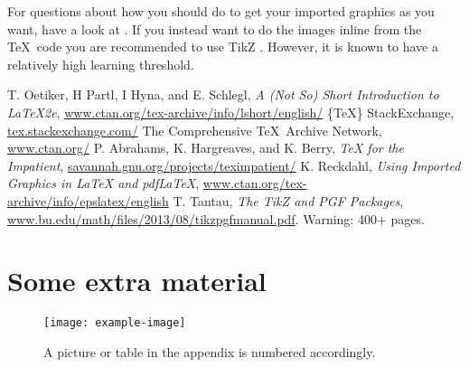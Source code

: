 \documentclass[11pt,twoside]{eitExjobb}
\begin{document}
For questions about how you should do to get your imported graphics as you want, have a look at \cite{cite:ImportedGraphics}. If you instead want to do the images inline from the \TeX\ code you are recommended to use TikZ \cite{cite:TikZ}. However, it is known to have a relatively high learning threshold. 

\begin{thebibliography}{99}
 T. Oetiker, H Partl, I Hyna, and E. Schlegl, \textit{A (Not So) Short Introduction to \LaTeX2e}, \url{www.ctan.org/tex-archive/info/lshort/english/}
 \{\TeX\} StackExchange, \url{tex.stackexchange.com/}
 The Comprehensive \TeX\ Archive Network, \url{www.ctan.org/}
 P. Abrahams, K. Hargreaves, and K. Berry, \textit{TeX for the Impatient}, \url{savannah.gnu.org/projects/teximpatient/}
 K. Reckdahl, \textit{Using Imported Graphics in LaTeX and pdfLaTeX}, \url{www.ctan.org/tex-archive/info/epslatex/english}
 T. Tantau, \textit{The TikZ and PGF Packages}, \url{www.bu.edu/math/files/2013/08/tikzpgfmanual.pdf}. Warning: 400+ pages.
\end{thebibliography}


\appendix
\chapter{Some extra material}
\lipsum[1]
\begin{figure}[htbp]
  \centering
  \texttt{[image: example-image]}
  \caption{A picture or table in the appendix is numbered accordingly.}
  \label{fig:AppFig}
\end{figure}
\end{document}
